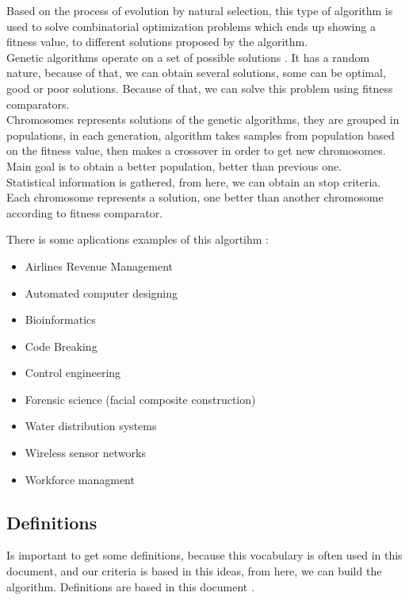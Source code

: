 \documentclass[letterpaper]{article}
\begin{document}
Based on the process of evolution by natural selection, this type of algorithm is used to solve combinatorial optimization problems which ends up showing a fitness value, to different solutions proposed by the algorithm.\\

Genetic algorithms operate on a set of possible solutions \cite{code}. It has a random nature, because of that, we can obtain several solutions, some can be optimal, good or poor solutions. Because of that, we can solve this problem using fitness comparators.\\

Chromosomes represents solutions of the genetic algorithms, they are grouped in populations, in each generation, algorithm takes samples from population based on the fitness value, then makes a crossover in order to get new chromosomes. Main goal is to obtain a better population, better than previous one.\\

Statistical information is gathered, from here, we can obtain an stop criteria. Each chromosome represents a solution, one better than another chromosome according to fitness comparator. 

There is some aplications examples of this algortihm \cite{piedad}: 

\begin{itemize}
\item Airlines Revenue Management
\item Automated computer designing
\item Bioinformatics
\item Code Breaking
\item Control engineering
\item Forensic science (facial composite construction)
\item Water distribution systems
\item Wireless sensor networks
\item Workforce managment
\end{itemize}




\subsection{Definitions}

Is important to get some definitions, because this vocabulary is often used in this document, and our criteria is based in this ideas, from here, we can build the algorithm. Definitions are based in this document \cite{code}.
\end{document}
